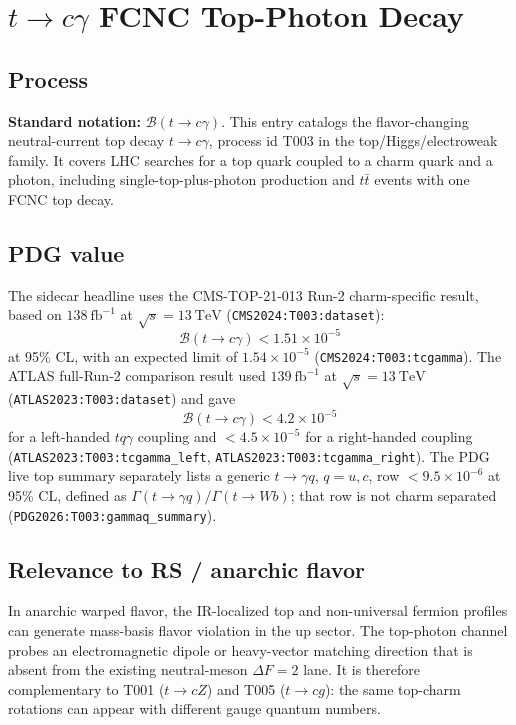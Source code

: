 
\section{\texorpdfstring{\(t\to c\gamma\)}{t -> c gamma} FCNC Top-Photon Decay}

\subsection*{Process}
\textbf{Standard notation:} \(\mathcal{B}(t\to c\gamma)\).
This entry catalogs the flavor-changing neutral-current top decay
\(t\to c\gamma\), process id T003 in the top/Higgs/electroweak family.  It
covers LHC searches for a top quark coupled to a charm quark and a photon,
including single-top-plus-photon production and \(t\bar t\) events with one
FCNC top decay.

\subsection*{PDG value}
The sidecar headline uses the CMS-TOP-21-013 Run-2 charm-specific result,
based on \(138~\mathrm{fb}^{-1}\) at \(\sqrt{s}=13~\mathrm{TeV}\)
(\texttt{CMS2024:T003:dataset}):
\[
  \mathcal{B}(t\to c\gamma)<1.51\times10^{-5}
\]
at 95\% CL, with an expected limit of \(1.54\times10^{-5}\)
(\texttt{CMS2024:T003:tcgamma}).  The ATLAS full-Run-2 comparison result used
\(139~\mathrm{fb}^{-1}\) at \(\sqrt{s}=13~\mathrm{TeV}\)
(\texttt{ATLAS2023:T003:dataset}) and gave
\[
  \mathcal{B}(t\to c\gamma)<4.2\times10^{-5}
\]
for a left-handed \(tq\gamma\) coupling and \(<4.5\times10^{-5}\) for a
right-handed coupling (\texttt{ATLAS2023:T003:tcgamma\_left},
\texttt{ATLAS2023:T003:tcgamma\_right}).  The PDG live top summary separately
lists a generic \(t\to\gamma q\), \(q=u,c\), row
\(<9.5\times10^{-6}\) at 95\% CL, defined as
\(\Gamma(t\to\gamma q)/\Gamma(t\to Wb)\); that row is not charm separated
(\texttt{PDG2026:T003:gammaq\_summary}).

\subsection*{Relevance to RS / anarchic flavor}
In anarchic warped flavor, the IR-localized top and non-universal fermion
profiles can generate mass-basis flavor violation in the up sector.  The
top-photon channel probes an electromagnetic dipole or heavy-vector matching
direction that is absent from the existing neutral-meson \(\Delta F=2\) lane.
It is therefore complementary to T001 (\(t\to cZ\)) and T005 (\(t\to cg\)):
the same top-charm rotations can appear with different gauge quantum numbers.

